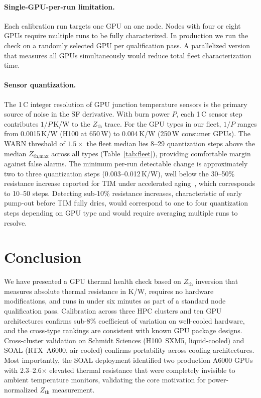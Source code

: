 \documentclass[conference]{IEEEtran}
\begin{document}
\paragraph{Single-GPU-per-run limitation.}
Each calibration run targets one GPU on one node.
Nodes with four or eight GPUs require multiple runs to be fully
characterized. In production we run the check on a randomly selected
GPU per qualification pass.
A parallelized version that measures all GPUs simultaneously would
reduce total fleet characterization time.

\paragraph{Sensor quantization.}
The 1\,\textdegree C integer resolution of GPU junction temperature
sensors is the primary source of noise in the SF derivative.
With burn power $P$, each 1\,\textdegree C sensor step contributes
$1/P$\,K/W to the $Z_\text{th}$ trace.
For the GPU types in our fleet, $1/P$ ranges from 0.0015\,K/W
(H100 at 650\,W) to 0.004\,K/W (250\,W consumer GPUs).
The WARN threshold of $1.5\times$ the fleet median lies 8--29
quantization steps above the median $Z_\text{th,max}$ across all
types (Table~\ref{tab:fleet}), providing comfortable margin against
false alarms.
The minimum per-run detectable change is approximately two to three
quantization steps (0.003--0.012\,K/W), well below the 30--50\%
resistance increase reported for TIM under accelerated
aging~\cite{skuriat2013,carlton2020}, which corresponds to 10--50
steps.
Detecting sub-10\% resistance increases, characteristic of early
pump-out before TIM fully dries, would correspond to one to four
quantization steps depending on GPU type and would require averaging
multiple runs to resolve.

\section{Conclusion}
\label{sec:conclusion}

We have presented a GPU thermal health check based on $Z_\text{th}$
inversion that measures absolute thermal resistance in K/W, requires
no hardware modifications, and runs in under six minutes as part of a
standard node qualification pass.
Calibration across three HPC clusters and ten GPU architectures
confirms sub-8\% coefficient of variation on well-cooled hardware,
and the cross-type rankings are consistent with known GPU package
designs.
Cross-cluster validation on Schmidt Sciences (H100~SXM5,
liquid-cooled) and SOAL (RTX~A6000, air-cooled) confirms portability
across cooling architectures.
Most importantly, the SOAL deployment identified two production
A6000 GPUs with 2.3--2.6$\times$ elevated thermal resistance that
were completely invisible to ambient temperature monitors, validating
the core motivation for power-normalized $Z_\text{th}$ measurement.
\end{document}
